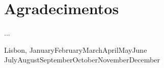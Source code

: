 \chapter*{Agradecimentos}
%

...


\vspace{1cm}
\begin{flushright}\noindent
Lisbon,
  \ifcase\month\or January\or February\or March\or April\or May\or June\or
    July\or August\or September\or October\or November\or December\fi\space
    \number\year\hfill {\it \myshortauthor}\\
\end{flushright}


